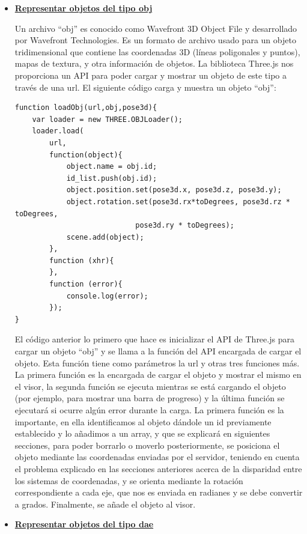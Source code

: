 \begin{itemize}
\item {\textbf{\underline{Representar objetos del tipo obj}}

Un archivo ``obj'' es conocido como Wavefront 3D Object File y desarrollado por Wavefront Technologies. Es un formato de archivo usado para un objeto tridimensional que contiene las coordenadas 3D (líneas poligonales y puntos), mapas de textura, y otra información de objetos. La biblioteca Three.js nos proporciona un API para poder cargar y mostrar un objeto de este tipo a través de una url. El siguiente código carga y muestra un objeto ``obj'':

\begin{lstlisting}[frame=single]
function loadObj(url,obj,pose3d){
	var loader = new THREE.OBJLoader();
	loader.load(
		url,
		function(object){
			object.name = obj.id;
			id_list.push(obj.id);
			object.position.set(pose3d.x, pose3d.z, pose3d.y);
			object.rotation.set(pose3d.rx*toDegrees, pose3d.rz * toDegrees, 
							pose3d.ry * toDegrees);
			scene.add(object);
		},
		function (xhr){
		},
		function (error){
			console.log(error);
		});
}
\end{lstlisting}

El código anterior lo primero que hace es inicializar el API de Three.js para cargar un objeto ``obj'' y se llama a la función del API encargada de cargar el objeto. Esta función tiene como parámetros la url y otras tres funciones más. La primera función es la encargada de cargar el objeto y mostrar el mismo en el visor, la segunda función se ejecuta mientras se está cargando el objeto (por ejemplo, para mostrar una barra de progreso) y la última función se ejecutará si ocurre algún error durante la carga. La primera función es la importante, en ella identificamos al objeto dándole un id previamente establecido y lo añadimos a un array, y que se explicará en siguientes secciones, para poder borrarlo o moverlo posteriormente, se posiciona el objeto mediante las coordenadas enviadas por el servidor, teniendo en cuenta el problema explicado en las secciones anteriores acerca de la disparidad entre los sistemas de coordenadas, y se orienta mediante la rotación correspondiente a cada eje, que nos es enviada en radianes y se debe convertir a grados.
Finalmente, se añade el objeto al visor.}

\item{\textbf{\underline{Representar objetos del tipo dae}}

}
\end{itemize}

